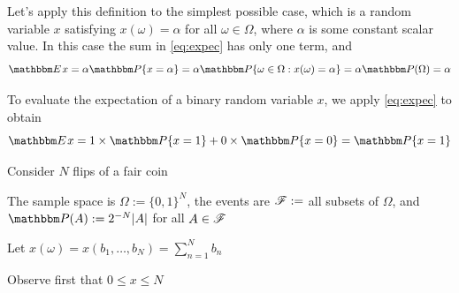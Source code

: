 \begin{frame}

    \vspace{2em}
    \Eg
    Let's apply this definition to the simplest possible case, which is a
    random variable $x$ satisfying $x(\omega) = \alpha$ for all $\omega \in
    \Omega$, where $\alpha$ is some constant scalar value.  In this case the
    sum in \eqref{eq:expec} has only one term, and 
    \begin{equation*}
        \EE x
        = \alpha \PP\{x = \alpha\} 
        = \alpha \PP\setntn{\omega \in \Omega}{x(\omega) = \alpha} 
        = \alpha \PP(\Omega) 
        = \alpha
    \end{equation*}
    
\end{frame}

\begin{frame}

    \vspace{2em}
    \Eg
    To evaluate the expectation of a binary random variable $x$,
    we apply \eqref{eq:expec} to obtain
    \begin{equation*}
        \label{eq:expbin}
        \EE x  = 1 \times \PP\{x=1\} + 0 \times \PP\{x = 0\} = \PP\{x=1\}
    \end{equation*}
\end{frame}

\begin{frame}

    \vspace{2em}
    \Eg
    Consider $N$ flips of a fair coin
    
    The sample space is $\Omega := \{0, 1\}^N$, the
    events are $\mathscr F :=$  all subsets of $\Omega$, and $\PP(A) := 2^{-N} |A|$ for
    all $A \in \mathscr F$
    
    Let 
        $x(\omega) = x(b_1, \ldots, b_N) = \sum_{n=1}^N b_n$
        
    
    Observe first that $0
    \leq x \leq N$
    
\end{frame}

